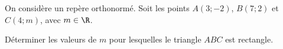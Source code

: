 
On considère un repère orthonormé.
Soit les points $A(3;-2)$, $B(7;2)$  et $C(4;m)$, avec $m \in \R$. 

Déterminer les valeurs de $m$ pour lesquelles le triangle $ABC$ est rectangle.